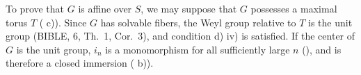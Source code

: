 \medskip
To prove that \(G\) is affine over \(S\), we may suppose that
\(G\) possesses a maximal torus \(T\) ( c)). Since \(G\) has
solvable fibers, the Weyl group relative to \(T\) is the unit
group (BIBLE, 6, Th.\ 1, Cor.\ 3), and condition  d) iv) is
satisfied. If the center of \(G\) is the unit group, \(i_n\) is a
monomorphism for all sufficiently large \(n\) (), and is
therefore a closed immersion ( b)).
